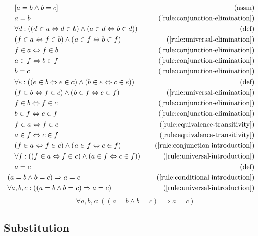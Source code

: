 \begin{align*}
    \assumption[1]{a = b \wedge b = c}\\
    \byrule[1]{a = b}{\ref{rule:conjunction-elimination}}\\
    \bydefinition[1]{\forall d: ((d \in a \lequiv d \in b) \wedge (a \in d \lequiv b \in d))}\\
    \byrule[1]{(f \in a \lequiv f \in b) \wedge (a \in f \lequiv b \in f)}{\ref{rule:universal-elimination}}\\
    \byrule[1]{f \in a \lequiv f \in b}{\ref{rule:conjunction-elimination}}\\
    \byrule[1]{a \in f \lequiv b \in f}{\ref{rule:conjunction-elimination}}\\
    \byrule[1]{b = c}{\ref{rule:conjunction-elimination}}\\
    \bydefinition[1]{\forall e: ((e \in b \lequiv e \in c) \wedge (b \in e \lequiv c \in e))}\\
    \byrule[1]{(f \in b \lequiv f \in c) \wedge (b \in f \lequiv c \in f)}{\ref{rule:universal-elimination}}\\
    \byrule[1]{f \in b \lequiv f \in c}{\ref{rule:conjunction-elimination}}\\
    \byrule[1]{b \in f \lequiv c \in f}{\ref{rule:conjunction-elimination}}\\
    \byrule[1]{f \in a \lequiv f \in c}{\ref{rule:equivalence-transitivity}}\\
    \byrule[1]{a \in f \lequiv c \in f}{\ref{rule:equivalence-transitivity}}\\
    \byrule[1]{(f \in a \lequiv f \in c) \wedge (a \in f \lequiv c \in f)}{\ref{rule:conjunction-introduction}}\\
    \byrule[1]{\forall f: ((f \in a \lequiv f \in c) \wedge (a \in f \lequiv c \in f))}{\ref{rule:universal-introduction}}\\
    \bydefinition[1]{a = c}\\
    \byrule{(a = b \wedge b = c) \implies a = c}{\ref{rule:conditional-introduction}}\\
    \byrule{\forall a, b, c: ((a = b \wedge b = c) \implies a = c)}{\ref{rule:universal-introduction}}
\end{align*}
\begin{equation}
    \vdash \forall a, b, c: ((a = b \wedge b = c) \implies a = c)
    \label{rule:equality-transitivity}
\end{equation}

\subsection{Substitution}


